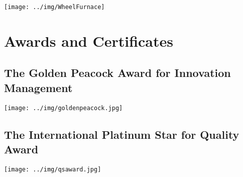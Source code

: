\begin{center}
\texttt{[image: ../img/WheelFurnace]}

\end{center}

\newpage

\section{Awards and Certificates}

\subsection{The Golden Peacock Award for Innovation Management}

\begin{center}
	\texttt{[image: ../img/goldenpeacock.jpg]}
\end{center}


\subsection{The International Platinum Star for Quality Award}

\begin{center}
	\texttt{[image: ../img/qsaward.jpg]}
\end{center}


